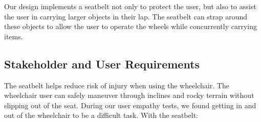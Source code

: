 \documentclass[12pt]{report}
\begin{document}
Our design implements a seatbelt not only to protect the user, but also to
assist the user in carrying larger objects in their lap. The seatbelt can strap
around these objects to allow the user to operate the wheels while concurrently
carrying items.

\subsection{Stakeholder and User Requirements}
The seatbelt helps reduce risk of injury when using the wheelchair. The wheelchair user can safely maneuver
through inclines and rocky terrain without slipping out of the seat.
During our user empathy tests, we found getting in and out of the
wheelchair to be a difficult task. With the seatbelt:
\end{document}
